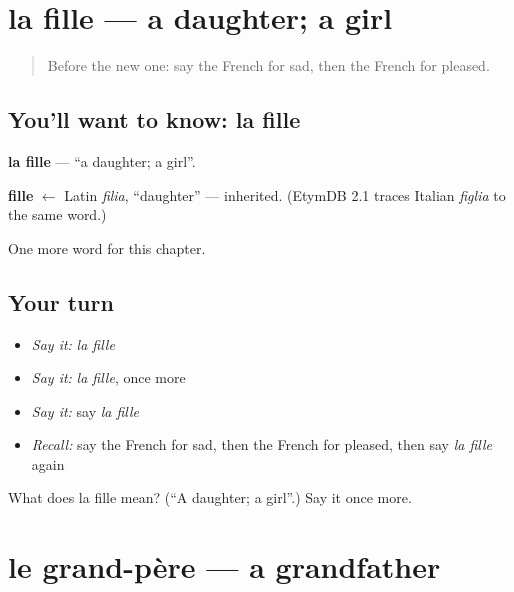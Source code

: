 \section[la fille]{la fille — a daughter; a girl}

\label{lesson:FR-C56-fille}



\begin{quote}
Before the new one: say the French for sad, then the French for pleased.
\end{quote}

\subsection*{You'll want to know: la fille}
\textbf{la fille} — \textquotedblleft{}a daughter; a girl\textquotedblright{}.

\begin{cousinweb}
\textbf{fille} $\leftarrow$ Latin \emph{filia}, \textquotedblleft{}daughter\textquotedblright{} — inherited. (EtymDB 2.1 traces Italian \emph{figlia} to the same word.)
\end{cousinweb}

\begin{grammarlens}[title={What you've built}]
One more word for this chapter.
\end{grammarlens}

\subsection*{Your turn}
\begin{itemize}
\raggedright
  \item \emph{Say it:} \emph{la fille}
  \item \emph{Say it:} \emph{la fille}, once more
  \item \emph{Say it:} say \emph{la fille}
  \item \emph{Recall:} say the French for sad, then the French for pleased, then say \emph{la fille} again
\end{itemize}

\begin{tcolorbox}[breakable,colback=teal!4,colframe=teal!35!black,title={Before you move on}]
What does la fille mean? (\textquotedblleft{}A daughter; a girl\textquotedblright{}.) Say it once more.
\end{tcolorbox}
\section[le grand-père]{le grand-père — a grandfather}

